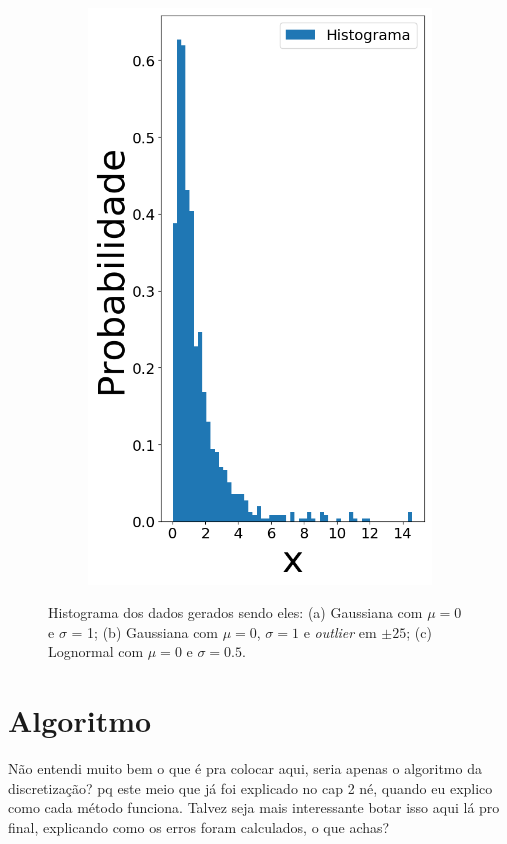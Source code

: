\begin{figure}[H]
\begin{subfigure}[b]{0.27\textwidth}
		\includegraphics[width=\linewidth]{./figuras/datalognormal_0}
		\caption{}
		\label{fig:randlog}
	\end{subfigure}
	
	\caption{Histograma dos dados gerados sendo eles: (a) Gaussiana com $\mu = 0$ e $\sigma$ = 1; (b) Gaussiana com $\mu = 0$, $\sigma = 1$ e \textit{outlier} em $\pm 25$; (c) Lognormal com $\mu = 0$ e $\sigma = 0.5$.}
	\label{fig:data}
\end{figure}

\section{Algoritmo}
{\color{red} Não entendi muito bem o que é pra colocar aqui, seria apenas o algoritmo da discretização? pq este meio que já foi explicado no cap 2 né, quando eu explico como cada método funciona. Talvez seja mais interessante botar isso aqui lá pro final, explicando como os erros foram calculados, o que achas?}


